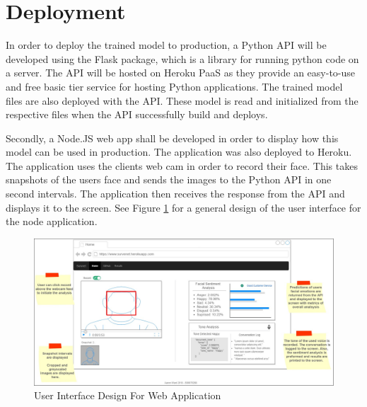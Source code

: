 \section{Deployment}
In order to deploy the trained model to production, a Python API will be developed using the Flask package, which is a library for running python code on a server. The API will be hosted on Heroku PaaS as they provide an easy-to-use and free basic tier service for hosting Python applications. The trained model files are also deployed with the API. These model is read and initialized from the respective files when the API successfully build and deploys.

Secondly, a Node.JS web app shall be developed in order to display how this model can be used in production. The application was also deployed to Heroku. The application uses the clients web cam in order to record their face. This takes snapshots of the users face and sends the images to the Python API in one second intervals. The application then receives the response from the API and displays it to the screen. 
See Figure \ref{ui} for a general design of the user interface for the node application.


\begin{figure}[ht]
	\begin{center}
		\advance\leftskip-3cm
		\advance\rightskip-3cm
		\includegraphics[keepaspectratio=true,scale=0.29]{__resources/Design/mockup_annotated.jpg}
		\caption{User Interface Design For Web Application}
		\label{ui}
	\end{center}
\end{figure}


